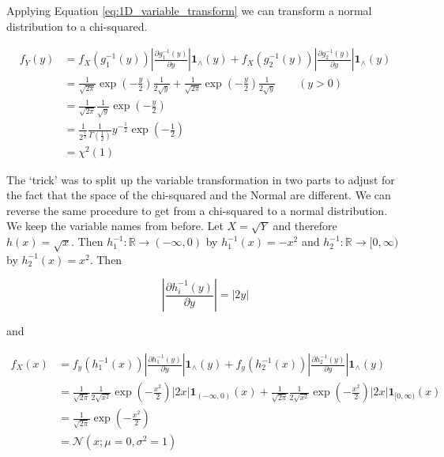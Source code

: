 Applying Equation \ref{eq:1D_variable_transform} we can transform a normal distribution to a chi-squared.

\begin{subequations}
\begin{align}
	f_Y(y) &= f_X(g_1^{-1}(y))	\left\vert\frac{\partial g_1^{-1}(y)}{\partial y} \right\vert \mathbf{1}_\wedge(y) + f_X(g_2^{-1}(y))	\left\vert\frac{\partial g_2^{-1}(y)}{\partial y} \right\vert \mathbf{1}_\wedge(y) \\
	&= \frac{1}{\sqrt{2\pi}} \exp(-\frac{y}{2}) \frac{1}{2\sqrt{y}} + \frac{1}{\sqrt{2\pi}} \exp(-\frac{y}{2}) \frac{1}{2\sqrt{y}} \qquad(y > 0)\\
	&= \frac{1}{\sqrt{2\pi}} \frac{1}{\sqrt{y}}\exp(-\frac{y}{2}) \\
	&= \frac{1}{2^{\frac{1}{2}}} \frac{1}{\Gamma(\frac{1}{2})} y^{-\frac{1}{2}} \exp(-\frac{1}{2}) \\
	&= \chi^2 (1)
\end{align}
\end{subequations}

The `trick' was to split up the variable transformation in two parts to adjust for the fact that the space of the chi-squared and the Normal are different. We can reverse the same procedure to get from a chi-squared to a normal distribution. We keep the variable names from before. Let $X = \sqrt{Y}$ and therefore $h(x) = \sqrt{x}$. Then $h_1^{-1}: \mathbb{R} \rightarrow (-\infty, 0)$ by $h_1^{-1}(x) = -x^2$ and $h_2^{-1}: \mathbb{R} \rightarrow [0, \infty)$ by $h_2^{-1}(x) = x^2$. Then

$$\left\vert\frac{\partial h_i^{-1}(y)}{\partial y} \right\vert = \vert 2y \vert $$

and

\begin{subequations}
\begin{align}
	f_X(x) &= f_y(h_1^{-1}(x)) \left\vert\frac{\partial h_1^{-1}(y)}{\partial y} \right\vert \mathbf{1}_\wedge(y) + f_y(h_2^{-1}(x)) \left\vert\frac{\partial h_2^{-1}(y)}{\partial y} \right\vert \mathbf{1}_\wedge(y) \nonumber \\
	&= \frac{1}{\sqrt{2\pi}} \frac{1}{2\sqrt{x^2}} \exp(-\frac{x^2}{2}) |2x| \mathbf{1}_{(-\infty, 0)}(x) + \frac{1}{\sqrt{2\pi}} \frac{1}{2\sqrt{x^2}} \exp(-\frac{x^2}{2}) |2x| \mathbf{1}_{[0, \infty)}(x) \\
	&= \frac{1}{\sqrt{2\pi}} \exp(-\frac{x^2}{2})  \\
	&= \mathcal{N}(x; \mu=0, \sigma^2=1)
\end{align}
\end{subequations}

